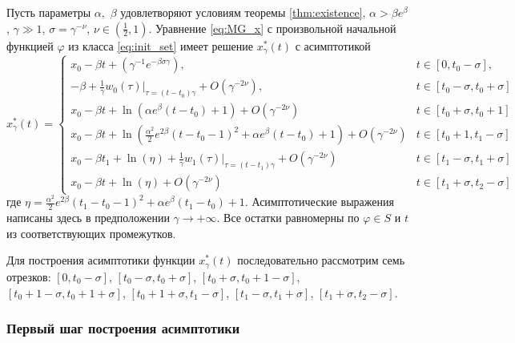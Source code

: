 \begin{theorem}
\label{thm:th_asymp}
Пусть параметры $\alpha,$ $\beta$ удовлетворяют условиям теоремы \ref{thm:existence}, $\alpha > \beta e^{\beta}$, $\gamma \gg 1$, $\sigma = \gamma^{-\nu}$, $\nu \in (\frac{1}{2}, 1)$. Уравнение \eqref{eq:MG_x} с произвольной начальной функцией $\varphi$ из класса \eqref{eq:init_set} имеет решение $x_\gamma^*(t)$ с асимптотикой
\footnotesize
\begin{equation}
	\label{eq:sol_x*gamma}
	x^*_\gamma(t)= 
	\begin{cases}
		x_0 - \beta t + (\gamma^{-1} e^{-\beta \sigma \gamma}), & t\in[0, t_0 - \sigma],\\
		-\beta + \frac{1}{\gamma} w_0(\tau)|_{\tau=(t-t_0)\gamma} + O(\gamma^{-2\nu}), & t \in [t_0-\sigma,t_0+\sigma]\\
		x_0 - \beta t + \ln(\alpha e^{\beta}(t - t_0)+1) + O(\gamma^{-2\nu}) & t\in[t_0 + \sigma, t_0 + 1]\\
		x_0 - \beta t + \ln(\frac{\alpha^2}{2}e^{2 \beta}(t - t_0 - 1)^2 + \alpha e^{\beta}(t - t_0) + 1) + O(\gamma^{-2\nu}) & t \in [t_0 + 1, t_1 - \sigma]\\
		x_0 - \beta t_1 + \ln(\eta)+\frac{1}{\gamma} w_1(\tau)|_{\tau=(t - t_1)\gamma} + O(\gamma^{-2\nu}) & t\in[t_1 - \sigma, t_1  +\sigma]\\
		x_0 - \beta t + \ln(\eta) + O(\gamma^{-2\nu}) & t \in [t_1+\sigma, t_2-\sigma]
	\end{cases}
\end{equation}
\normalsize
где $\eta=\frac{\alpha^2}{2}e^{2\beta}(t_1 - t_0 - 1)^2 + \alpha e^{\beta}(t_1 - t_0) + 1$.
Асимптотические выражения написаны здесь в предположении $\gamma\to+\infty$.
Все остатки равномерны по $\varphi \in S$ и $t$ из соответствующих промежутков.
\end{theorem}

Для построения асимптотики функции $x_\gamma^*(t)$ последовательно рассмотрим семь отрезков:
$[0, t_0 - \sigma]$, 
$[t_0  -\sigma, t_0 + \sigma]$,
$[t_0 + \sigma, t_0 + 1 - \sigma]$,
$[t_0 + 1 - \sigma, t_0 + 1 + \sigma]$,
$[t_0 + 1 + \sigma, t_1 - \sigma]$,
$[t_1 - \sigma, t_1 + \sigma]$,
$[t_1 + \sigma, t_2 - \sigma]$.

\subsubsection{Первый шаг построения асимптотики}


